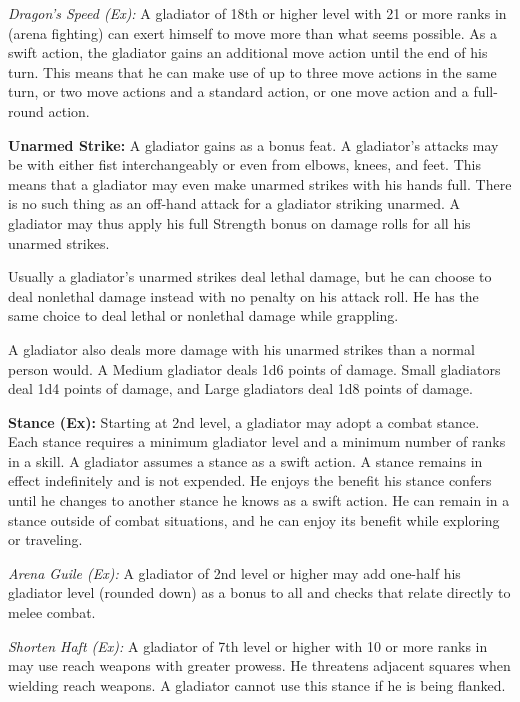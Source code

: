\textit{Dragon's Speed (Ex):} A gladiator of 18th or higher level with 21 or more ranks in  (arena fighting) can exert himself to move more than what seems possible. As a swift action, the gladiator gains an additional move action until the end of his turn. This means that he can make use of up to three move actions in the same turn, or two move actions and a standard action, or one move action and a full-round action.

\textbf{Unarmed Strike:} A gladiator gains  as a bonus feat. A gladiator's attacks may be with either fist interchangeably or even from elbows, knees, and feet. This means that a gladiator may even make unarmed strikes with his hands full. There is no such thing as an off-hand attack for a gladiator striking unarmed. A gladiator may thus apply his full Strength bonus on damage rolls for all his unarmed strikes.

Usually a gladiator's unarmed strikes deal lethal damage, but he can choose to deal nonlethal damage instead with no penalty on his attack roll. He has the same choice to deal lethal or nonlethal damage while grappling.

A gladiator also deals more damage with his unarmed strikes than a normal person would. A Medium gladiator deals 1d6 points of damage. Small gladiators deal 1d4 points of damage, and Large gladiators deal 1d8 points of damage.

\textbf{Stance (Ex):} Starting at 2nd level, a gladiator may adopt a combat stance. Each stance requires a minimum gladiator level and a minimum number of ranks in a skill. A gladiator assumes a stance as a swift action. A stance remains in effect indefinitely and is not expended. He enjoys the benefit his stance confers until he changes to another stance he knows as a swift action. He can remain in a stance outside of combat situations, and he can enjoy its benefit while exploring or traveling.

\textit{Arena Guile (Ex):} A gladiator of 2nd level or higher may add one-half his gladiator level (rounded down) as a bonus to all  and  checks that relate directly to melee combat.

\textit{Shorten Haft (Ex):} A gladiator of 7th level or higher with 10 or more ranks in  may use reach weapons with greater prowess. He threatens adjacent squares when wielding reach weapons. A gladiator cannot use this stance if he is being flanked. 

